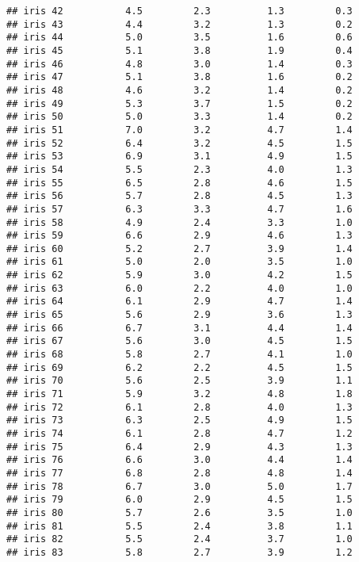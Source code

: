 \documentclass[
]{article}
\begin{document}
\begin{verbatim}
## iris 42           4.5         2.3          1.3         0.3
## iris 43           4.4         3.2          1.3         0.2
## iris 44           5.0         3.5          1.6         0.6
## iris 45           5.1         3.8          1.9         0.4
## iris 46           4.8         3.0          1.4         0.3
## iris 47           5.1         3.8          1.6         0.2
## iris 48           4.6         3.2          1.4         0.2
## iris 49           5.3         3.7          1.5         0.2
## iris 50           5.0         3.3          1.4         0.2
## iris 51           7.0         3.2          4.7         1.4
## iris 52           6.4         3.2          4.5         1.5
## iris 53           6.9         3.1          4.9         1.5
## iris 54           5.5         2.3          4.0         1.3
## iris 55           6.5         2.8          4.6         1.5
## iris 56           5.7         2.8          4.5         1.3
## iris 57           6.3         3.3          4.7         1.6
## iris 58           4.9         2.4          3.3         1.0
## iris 59           6.6         2.9          4.6         1.3
## iris 60           5.2         2.7          3.9         1.4
## iris 61           5.0         2.0          3.5         1.0
## iris 62           5.9         3.0          4.2         1.5
## iris 63           6.0         2.2          4.0         1.0
## iris 64           6.1         2.9          4.7         1.4
## iris 65           5.6         2.9          3.6         1.3
## iris 66           6.7         3.1          4.4         1.4
## iris 67           5.6         3.0          4.5         1.5
## iris 68           5.8         2.7          4.1         1.0
## iris 69           6.2         2.2          4.5         1.5
## iris 70           5.6         2.5          3.9         1.1
## iris 71           5.9         3.2          4.8         1.8
## iris 72           6.1         2.8          4.0         1.3
## iris 73           6.3         2.5          4.9         1.5
## iris 74           6.1         2.8          4.7         1.2
## iris 75           6.4         2.9          4.3         1.3
## iris 76           6.6         3.0          4.4         1.4
## iris 77           6.8         2.8          4.8         1.4
## iris 78           6.7         3.0          5.0         1.7
## iris 79           6.0         2.9          4.5         1.5
## iris 80           5.7         2.6          3.5         1.0
## iris 81           5.5         2.4          3.8         1.1
## iris 82           5.5         2.4          3.7         1.0
## iris 83           5.8         2.7          3.9         1.2

\end{verbatim}
\end{document}
